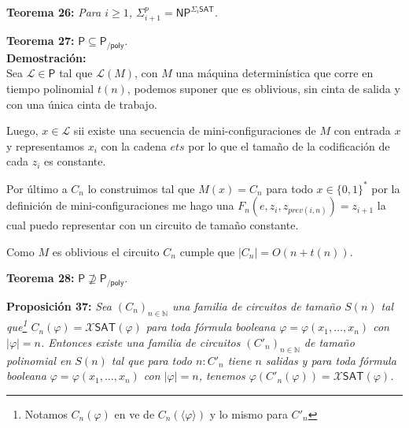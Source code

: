\documentclass{article}
\begin{document}
\begin{flushleft}
  \textbf{Teorema 26:}
  \textit{Para $i \geq 1$, $\Sigma^p_{i+1} = \mathsf{NP}^{\Sigma_i \mathsf{SAT}}$.}
\end{flushleft}

\begin{flushleft}
  \textbf{\hypertarget{teo27}{Teorema 27:}}
  $\mathsf{P \subseteq P_{/poly}}$. \\[0.5em]

  \textbf{\textcolor{Mulberry}{Demostración:}} \\[0.5em]

  Sea $\mathcal{L} \in \mathsf{P}$ tal que $\mathcal{L}(M)$, con $M$ una máquina determinística que corre en 
  tiempo polinomial $t(n)$, podemos suponer que es oblivious, sin cinta de salida y con una única cinta de trabajo.

  Luego, $x \in \mathcal{L}$ sii existe una secuencia de mini-configuraciones de $M$ con entrada $x$ y representamos $x_i$
  con la cadena $ets$ por lo que el tamaño de la codificación de cada $z_i$ es constante.

  Por último a $C_n$ lo construimos tal que $M(x) = C_n$ para todo $x \in \{0,1\}^*$ por la definición de 
  mini-configuraciones me hago una $F_n(e, z_i, z_{prev(i,n)}) = z_{i+1}$ la cual puedo representar con un circuito 
  de tamaño constante.

  Como $M$ es oblivious el circuito $C_n$ cumple que $|C_n| = O(n + t(n))$.

\end{flushleft}

\begin{flushleft}
  \textbf{Teorema 28:}
  $\mathsf{P \nsupseteq P_{/poly}}$.
\end{flushleft}

\begin{flushleft}
  \textbf{Proposición 37:}
  \textit{Sea $(C_n)_{n \in \mathbb{N}}$ una familia de circuitos de tamaño $S(n)$ tal que\footnote{Notamos
  $C_n(\varphi)$ en ve de $C_n(\langle \varphi \rangle)$ y lo mismo para $C'_n$} $C_n(\varphi) = \mathcal{X}
  \mathsf{SAT}(\varphi)$ para toda fórmula booleana $\varphi = \varphi(x_1, \dots , x_n)$ con $|\varphi| = n$.
  Entonces existe una familia de circuitos $(C'_n)_{n \in \mathbb{N}}$ de tamaño polinomial en $S(n)$ tal que
  para todo $n: C'_n$ tiene $n$ salidas y para toda fórmula booleana $\varphi = \varphi(x_1, \dots, x_n)$ 
  con $|\varphi| = n$, tenemos $\varphi(C'_n(\varphi)) = \mathcal{X}\mathsf{SAT}(\varphi)$.}
\end{flushleft}
\end{document}
